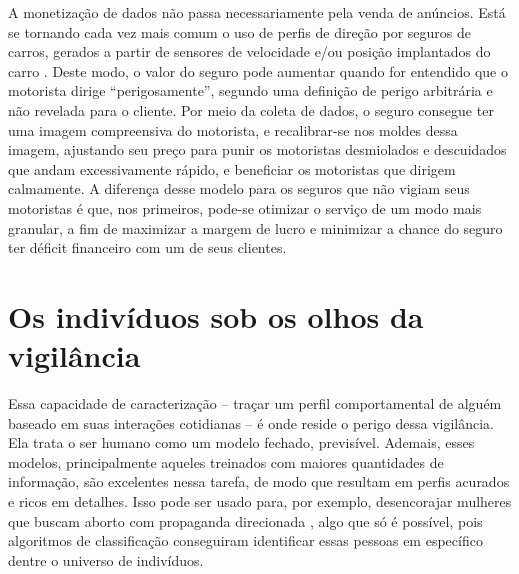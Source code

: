 A monetização de dados não passa necessariamente pela venda de anúncios.
Está se tornando cada vez mais comum o uso de perfis de direção por seguros de carros, gerados a partir de sensores de velocidade e/ou posição implantados do carro \cite{mckinsey_monetizing_2016, hill_automakers_2024}.
Deste modo, o valor do seguro pode aumentar quando for entendido que o motorista dirige ``perigosamente'', segundo uma definição de perigo arbitrária e não revelada para o cliente.
Por meio da coleta de dados, o seguro consegue ter uma imagem compreensiva do motorista, e recalibrar-se nos moldes dessa imagem, ajustando seu preço para punir os motoristas desmiolados e descuidados que andam excessivamente rápido, e beneficiar os motoristas que dirigem calmamente.
A diferença desse modelo para os seguros que não vigiam seus motoristas é que, nos primeiros, pode-se otimizar o serviço de um modo mais granular, a fim de maximizar a margem de lucro e minimizar a chance do seguro ter déficit financeiro com um de seus clientes.

\section{Os indivíduos sob os olhos da vigilância}

Essa capacidade de caracterização -- traçar um perfil comportamental de alguém baseado em suas interações cotidianas -- é onde reside o perigo dessa vigilância.
Ela trata o ser humano como um modelo fechado, previsível.
Ademais, esses modelos, principalmente aqueles treinados com maiores quantidades de informação, são excelentes nessa tarefa, de modo que resultam em perfis acurados e ricos em detalhes.
Isso pode ser usado para, por exemplo, desencorajar mulheres que buscam aborto com propaganda direcionada \cite{coutts_antichoice_2016}, algo que só é possível, pois algoritmos de classificação conseguiram identificar essas pessoas em específico dentre o universo de indivíduos.


